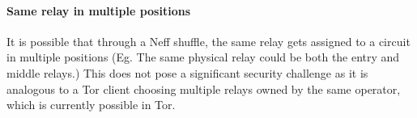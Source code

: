{\paragraph{Same relay in multiple positions}  It is possible that through
a Neff shuffle, the same relay gets assigned to a circuit in multiple
positions (Eg. The same physical relay could be both the entry and middle
relays.) This does not pose a significant security challenge as it is
analogous to a Tor client choosing multiple relays owned by the same operator,
which is currently possible in Tor.







}
